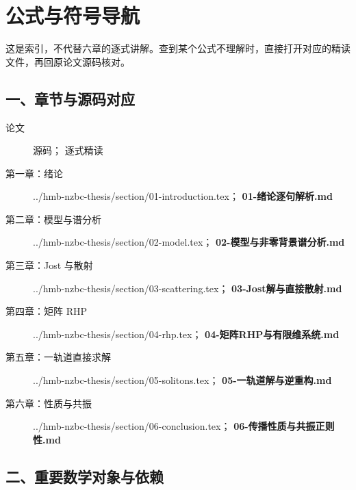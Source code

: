 
\chapter{公式与符号导航}

这是索引，不代替六章的逐式讲解。查到某个公式不理解时，直接打开对应的精读文件，再回原论文源码核对。\par

\section{一、章节与源码对应}

{\sloppy
\raggedright
\begin{description}
\item[论文] 源码； 逐式精读
\item[第一章：绪论] ../hmb-nzbc-thesis/section/01-introduction.tex； \textbf{01-绪论逐句解析.md}
\item[第二章：模型与谱分析] ../hmb-nzbc-thesis/section/02-model.tex； \textbf{02-模型与非零背景谱分析.md}
\item[第三章：Jost 与散射] ../hmb-nzbc-thesis/section/03-scattering.tex； \textbf{03-Jost解与直接散射.md}
\item[第四章：矩阵 RHP] ../hmb-nzbc-thesis/section/04-rhp.tex； \textbf{04-矩阵RHP与有限维系统.md}
\item[第五章：一轨道直接求解] ../hmb-nzbc-thesis/section/05-solitons.tex； \textbf{05-一轨道解与逆重构.md}
\item[第六章：性质与共振] ../hmb-nzbc-thesis/section/06-conclusion.tex； \textbf{06-传播性质与共振正则性.md}
\end{description}
}

\section{二、重要数学对象与依赖}

